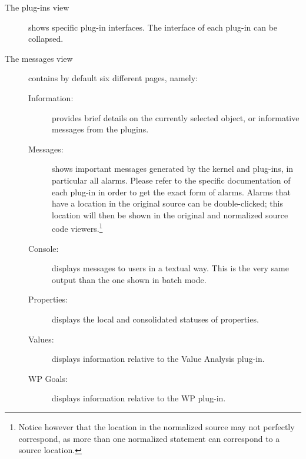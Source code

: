 \begin{description}
\item [The plug-ins view] shows specific plug-in interfaces. The interface
  of each plug-in can be collapsed.

\item [The messages view] contains by default six different pages, namely:

\begin {description}
\item [Information:] provides brief details on the currently
  selected object, or informative messages from the plugins.

\item [Messages:] shows important messages generated by the \FramaC kernel
  and plug-ins, in particular all alarms. Please refer to the
  specific documentation of each plug-in in order to get the exact form of
  alarms. Alarms that have a location in the original source can be
  double-clicked; this location will then be shown in the original and
  normalized source code viewers.\footnote{Notice however that the location
  in the normalized source may not perfectly correspond, as more
  than one normalized statement can correspond to a source location.}

\item [Console:] displays messages to users in a textual way. This
  is the very same output than the one shown in batch mode.

\item [Properties:] displays the local and consolidated statuses of
  properties.

\item [Values:] displays information relative to the Value Analysis
  plug-in.

\item [WP Goals:] displays information relative to the WP plug-in.

\end {description}

\end {description}


